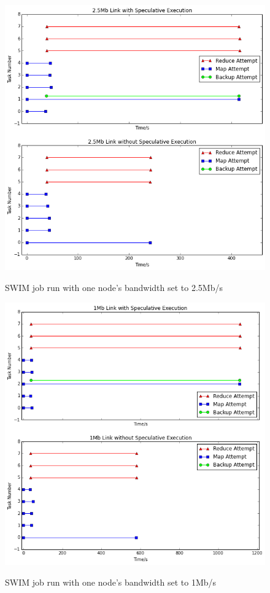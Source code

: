 \documentclass{ucetd}
\begin{document}
\begin{figure}
    {\includegraphics[width=\textwidth]{plots/2-5Mb.png}}
    \caption[Tests with link bandwidth of 2.5Mb/s]{SWIM job run with one node's
    bandwidth set to 2.5Mb/s}
    \label{fig:2-5Mb}
\end{figure}

\begin{figure}
    {\includegraphics[width=\textwidth]{plots/1Mb.png}}
    \caption[Tests with link bandwidth of 1Mb/s]{SWIM job run with one node's
    bandwidth set to 1Mb/s}
    \label{fig:1Mb}
\end{figure}
\end{document}

